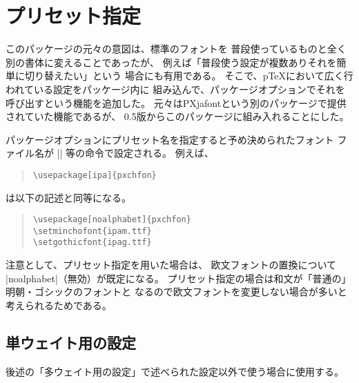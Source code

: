 \documentclass[a4paper,uplatex]{jsarticle}
\newcommand{\Pkg}[1]{\textsf{#1}}
\providecommand{\pTeX}{p\TeX}
\begin{document}
\section{プリセット指定}
\label{sec:Preset}

このパッケージの元々の意図は、標準のフォントを
普段使っているものと全く別の書体に変えることであったが、
例えば「普段使う設定が複数ありそれを簡単に切り替えたい」という
場合にも有用である。
そこで、{\pTeX}において広く行われている設定をパッケージ内に
組み込んで、パッケージオプションでそれを呼び出すという機能を追加した。
元々は\Pkg{PXjafont}という別のパッケージで提供されていた機能であるが、
0.5版からこのパッケージに組み入れることにした。

パッケージオプションにプリセット名を指定すると予め決められたフォント
ファイル名が |\setminchofont| 等の命令で設定される。
例えば、
\begin{quote}\small\begin{verbatim}
\usepackage[ipa]{pxchfon}
\end{verbatim}\end{quote}
は以下の記述と同等になる。
\begin{quote}\small\begin{verbatim}
\usepackage[noalphabet]{pxchfon}
\setminchofont{ipam.ttf}
\setgothicfont{ipag.ttf}
\end{verbatim}\end{quote}

注意として、プリセット指定を用いた場合は、
欧文フォントの置換について |noalphabet|（無効）が既定になる。
プリセット指定の場合は和文が「普通の」明朝・ゴシックのフォントと
なるので欧文フォントを変更しない場合が多いと考えられるためである。

\subsection{単ウェイト用の設定}

後述の「多ウェイト用の設定」で述べられた設定以外で使う場合に使用する。
\end{document}

